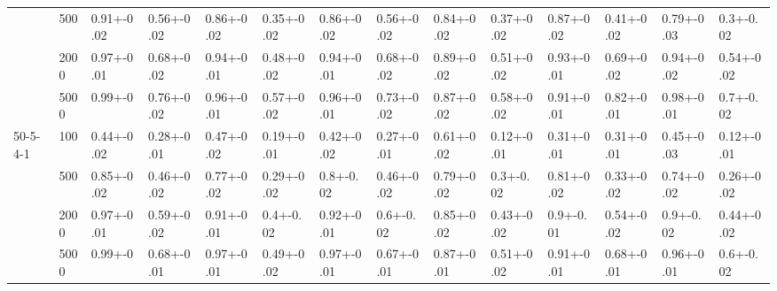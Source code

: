 \begin{landscape}
\begin{center}
{\begin{tabular}{llllllllllllll}
           & 500     & 0.91+-0.02                    & 0.56+-0.02                 & 0.86+-0.02                    & 0.35+-0.02                 & 0.86+-0.02                    & 0.56+-0.02                 & 0.84+-0.02                    & 0.37+-0.02                 & 0.87+-0.02                    & 0.41+-0.02                 & 0.79+-0.03                    & 0.3+-0.02                  \\
           & 2000    & 0.97+-0.01                    & 0.68+-0.02                 & 0.94+-0.01                    & 0.48+-0.02                 & 0.94+-0.01                    & 0.68+-0.02                 & 0.89+-0.02                    & 0.51+-0.02                 & 0.93+-0.01                    & 0.69+-0.02                 & 0.94+-0.02                    & 0.54+-0.02                 \\
           & 5000    & 0.99+-0                       & 0.76+-0.02                 & 0.96+-0.01                    & 0.57+-0.02                 & 0.96+-0.01                    & 0.73+-0.02                 & 0.87+-0.02                    & 0.58+-0.02                 & 0.91+-0.01                    & 0.82+-0.01                 & 0.98+-0.01                    & 0.7+-0.02                  \\ \hline
50-5-4-1   & 100     & 0.44+-0.02                    & 0.28+-0.01                 & 0.47+-0.02                    & 0.19+-0.01                 & 0.42+-0.02                    & 0.27+-0.01                 & 0.61+-0.02                    & 0.12+-0.01                 & 0.31+-0.01                    & 0.31+-0.01                 & 0.45+-0.03                    & 0.12+-0.01                 \\
           & 500     & 0.85+-0.02                    & 0.46+-0.02                 & 0.77+-0.02                    & 0.29+-0.02                 & 0.8+-0.02                     & 0.46+-0.02                 & 0.79+-0.02                    & 0.3+-0.02                  & 0.81+-0.02                    & 0.33+-0.02                 & 0.74+-0.02                    & 0.26+-0.02                 \\
           & 2000    & 0.97+-0.01                    & 0.59+-0.02                 & 0.91+-0.01                    & 0.4+-0.02                  & 0.92+-0.01                    & 0.6+-0.02                  & 0.85+-0.02                    & 0.43+-0.02                 & 0.9+-0.01                     & 0.54+-0.02                 & 0.9+-0.02                     & 0.44+-0.02                 \\
           & 5000    & 0.99+-0                       & 0.68+-0.01                 & 0.97+-0.01                    & 0.49+-0.02                 & 0.97+-0.01                    & 0.67+-0.01                 & 0.87+-0.01                    & 0.51+-0.02                 & 0.91+-0.01                    & 0.68+-0.01                 & 0.96+-0.01                    & 0.6+-0.02                  \\ \hline
\end{tabular}}
\end{center}
\end{landscape}

